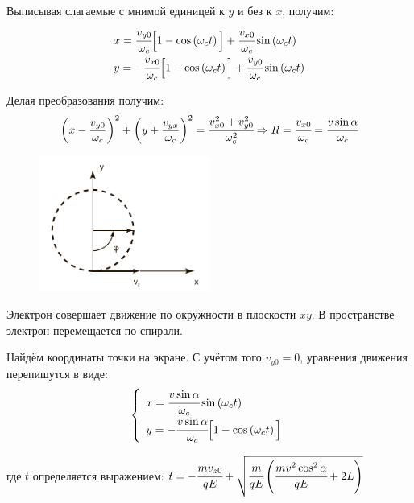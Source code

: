 Выписывая слагаемые с мнимой единицей к \( y \) и без к \( x \), получим:
\[
	\begin{array}{ll}
		x = \cfrac{v_{y0}}{\omega_c}
			\Big[ 1 - \cos\left( \omega_c t \right) \Big] + 
			\cfrac{v_{x0}}{\omega_c}\sin\left( \omega_c t \right) \\
		y = -\cfrac{v_{x0}}{\omega_c}
			\Big[ 1 - \cos\left( \omega_c t \right) \Big] + 
			\cfrac{v_{y0}}{\omega_c}\sin\left( \omega_c t \right) \\
	\end{array}
\]

Делая преобразования получим:
\[
	\left( x - \frac{v_{y0}}{\omega_c} \right)^2 + 
	\left( y + \frac{v_{yx}}{\omega_c} \right)^2 = 
	\cfrac{v^2_{x0} + v^2_{y0}}{\omega^2_c} 
	\Rightarrow R = \cfrac{v_{x0}}{\omega_c} = 
	\cfrac{v\sin\alpha}{\omega_c}
\]

\begin{figure}
    \vspace{-2ex}
    \includegraphics[width=0.5\textwidth]{images/im_02}
\end{figure}

Электрон совершает движение по окружности в плоскости \( xy \). 
В пространстве электрон перемещается по спирали.

Найдём координаты точки на экране. С учётом того \( v_{y0} = 0 \), уравнения 
движения перепишутся в виде:
\[
	\left\{ \begin{array}{ll}
		x = \cfrac{v\sin\alpha}{\omega_c}\sin\left( \omega_c t \right) \\
		y = -\cfrac{v\sin\alpha}{\omega_c}
			\Big[ 1 - \cos\left( \omega_c t \right) \Big]
	\end{array} \right.
\]

где \( t \) определяется выражением:
\(
	t = -\cfrac{mv_{z0}}{qE} + 
	\sqrt{ \cfrac{m}{qE}\left( \cfrac{mv^2\cos^2\alpha}{qE} + 2L \right)} 
\)

\pagebreak


